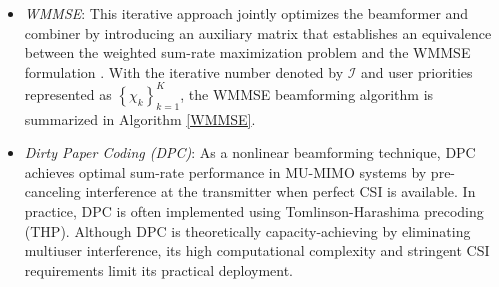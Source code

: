 \documentclass[lettersize,journal]{IEEEtran}
\begin{document}
\begin{appendices}
\begin{itemize}
\begin{equation}
     \mathbf{H}_{\overline{k}}=[\mathbf{H}_1^H,\cdots,\mathbf{H}_{k-1}^H,\mathbf{H}_{k+1}^H,\cdots,\mathbf{H}_K^H]^H.   
    \end{equation}
    Extract its null-space basis of $\mathbf{H}_{\overline{k}}$ by
    \begin{equation}
\mathbf{H}_{\overline{k}}=\mathbf{U}_{\overline{k}}\bm{\Sigma}_{\overline{k}}\left[\mathbf{V}_{\overline{k}}^{(1)},\mathbf{V}_{\overline{k}}^{(0)}\right]^H,
    \end{equation}
    and use $\mathbf{V}_{\overline{k}}^{(0)}$ as the pre-beamformer, which is the matrix containing the eigenvectors associated with the eigenvalue of $0$. As such, the effective channel $\overline{\mathbf{H}}_k = \mathbf{H}_k \mathbf{V}_{\overline{k}}^{(0)}$
  becomes interference-free, enabling independent single-user MIMO processing. Apply SVD to the effective channel for user $k$ as 
  \begin{equation}
\overline{\mathbf{H}}_k=\overline{\mathbf{U}}_k\overline{\bm{\Sigma}}_k\left[\overline{\mathbf{V}}^{(1)}_k,\overline{\mathbf{V}}^{(0)}_k\right]^H.   
  \end{equation}
  Then, the BD beamforming is given by
  \begin{equation}
{\bf{W}} = \left[ {{\bf{V}}_{\bar 1}^{(0)}\overline {\bf{V}} _1^{(1)}, \cdots ,{\bf{V}}_{\bar K}^{(0)}\overline {\bf{V}} _K^{(1)}} \right]. 
  \end{equation}
 This approach achieves perfect interference suppression but requires high computational complexity due to iterative null-space SVDs and is feasible only when $K \leq N_t$.
    \item \emph{WMMSE}: This iterative approach jointly optimizes the beamformer and combiner by introducing an auxiliary matrix that establishes an equivalence between the weighted sum-rate maximization problem and the WMMSE formulation \cite{wmmse,WMMSE1,DWMMSE1}. With the iterative number denoted by $\mathcal{I}$ and user priorities represented as $\left\{\chi_k\right\}_{k=1}^K$, the WMMSE beamforming algorithm is summarized in Algorithm \ref{WMMSE}.
    \item \emph{Dirty Paper Coding (DPC)}: As a nonlinear beamforming technique, DPC achieves optimal sum-rate performance in MU-MIMO systems by pre-canceling interference at the transmitter when perfect CSI is available. In practice, DPC is often implemented using Tomlinson-Harashima precoding (THP). Although DPC is theoretically capacity-achieving by eliminating multiuser interference, its high computational complexity and stringent CSI requirements limit its practical deployment.
\end{itemize}



\end{appendices}
\end{document}
